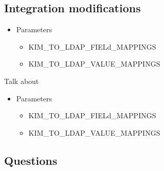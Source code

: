 \documentclass[12pt,notitlepage]{article}
\begin{document}
\begin{s5presentation}
\begin{s5slide}
\begin{s5notes}
      \W \end{s5notes}
    \W \end{s5slide}

  \W \begin{s5slide}
    \section{Integration modifications}
    \begin{itemize}
      \item Parameters
        \begin{itemize}
          \item KIM\_TO\_LDAP\_FIELd\_MAPPINGS
          \item KIM\_TO\_LDAP\_VALUE\_MAPPINGS
        \end{itemize}
    \end{itemize}

    \W \begin{s5notes}
      \W \end{s5notes}
\W \begin{s5notes}
  Talk about

    \begin{itemize}
      \item Parameters
        \begin{itemize}
          \item KIM\_TO\_LDAP\_FIELd\_MAPPINGS
          \item KIM\_TO\_LDAP\_VALUE\_MAPPINGS
        \end{itemize}
    \end{itemize}

\W \end{s5notes}
    \W \end{s5slide}

  \W \begin{s5slide}
    \W \section{Questions}

    \W \end {s5slide}
  \W \end{s5presentation}
\end{document}
